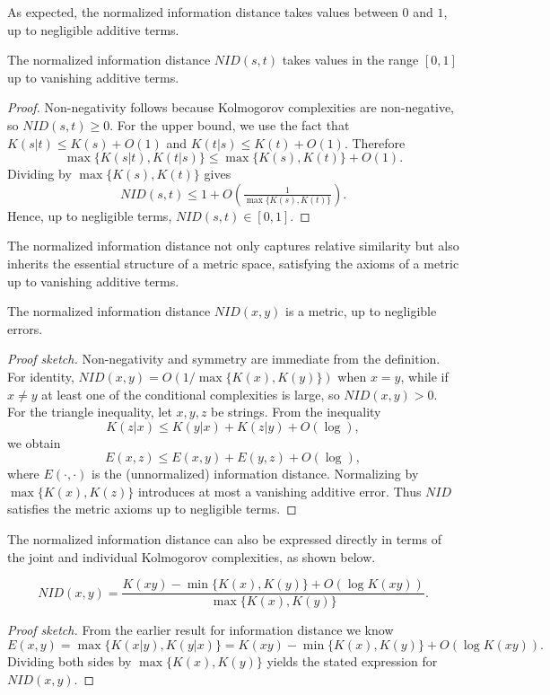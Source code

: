As expected, the normalized information distance takes values between $0$ and $1$, up to negligible additive terms.

\begin{proposition}
\label{prop:ncd_between_zero_and_one}
The normalized information distance $NID(s, t)$ takes values in the range $[0, 1]$ up to vanishing additive terms.
\end{proposition}
\begin{proof}
Non-negativity follows because Kolmogorov complexities are non-negative, so $NID(s,t)\geq 0$. 
For the upper bound, we use the fact that $K(s|t) \leq K(s) + O(1)$ and $K(t|s)\leq K(t) + O(1)$. 
Therefore
\[
\max\{K(s|t),K(t|s)\} \leq \max\{K(s),K(t)\} + O(1).
\]
Dividing by $\max\{K(s),K(t)\}$ gives
\[
NID(s,t) \leq 1 + O\!\left(\tfrac{1}{\max\{K(s),K(t)\}}\right).
\]
Hence, up to negligible terms, $NID(s,t)\in [0,1]$.
\end{proof}

The normalized information distance not only captures relative similarity but also inherits the essential structure of a metric space, satisfying the axioms of a metric up to vanishing additive terms.

\begin{proposition}
The normalized information distance $NID(x, y)$ is a metric, up to negligible errors.
\end{proposition}
\begin{proof}[Proof sketch]
Non-negativity and symmetry are immediate from the definition. 
For identity, $NID(x,y)=O(1/\max\{K(x),K(y)\})$ when $x=y$, while if $x\neq y$ at least one of the conditional complexities is large, so $NID(x,y) > 0$. 
For the triangle inequality, let $x,y,z$ be strings. From the inequality
\[
K(z|x) \leq K(y|x) + K(z|y) + O(\log),
\]
we obtain
\[
E(x,z) \leq E(x,y) + E(y,z) + O(\log),
\]
where $E(\cdot,\cdot)$ is the (unnormalized) information distance. 
Normalizing by $\max\{K(x),K(z)\}$ introduces at most a vanishing additive error. 
Thus $NID$ satisfies the metric axioms up to negligible terms.
\end{proof}

The normalized information distance can also be expressed directly in terms of the joint and individual Kolmogorov complexities, as shown below.

\begin{proposition}
\[
NID(x, y) = \frac{ K(xy) - \min\{ K(x), K(y) \} + O(\log K(xy)) }{ \max \{ K(x), K(y) \} }.
\]
\end{proposition}
\begin{proof}[Proof sketch]
From the earlier result for information distance we know
\[
E(x,y) = \max\{K(x|y),K(y|x)\} = K(xy) - \min\{K(x),K(y)\} + O(\log K(xy)).
\]
Dividing both sides by $\max\{K(x),K(y)\}$ yields the stated expression for $NID(x,y)$.
\end{proof}

